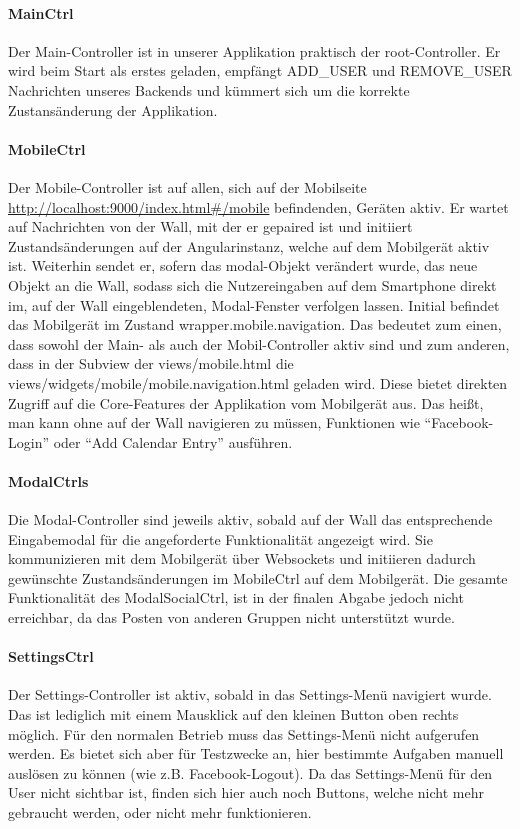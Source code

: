 \documentclass[10pt,a4paper]{report}
\newcommand{\code}[1]{{\fontfamily{cmvtt}\selectfont #1}}
\begin{document}
				\paragraph{MainCtrl}
					Der Main-Controller ist in unserer Applikation praktisch der root-Controller. Er wird beim Start als erstes geladen, empfängt \code{ADD\_USER} und \code{REMOVE\_USER} Nachrichten unseres Backends und kümmert sich um die korrekte Zustansänderung der Applikation.
				\paragraph{MobileCtrl}
					Der Mobile-Controller ist auf allen, sich auf der Mobilseite \url{http://localhost:9000/index.html\#/mobile} befindenden, Geräten aktiv. Er wartet auf Nachrichten von der Wall, mit der er gepaired ist und initiiert Zustandsänderungen auf der Angularinstanz, welche auf dem Mobilgerät aktiv ist. Weiterhin sendet er, sofern das \code{modal}-Objekt verändert wurde, das neue Objekt an die Wall, sodass sich die Nutzereingaben auf dem Smartphone direkt im, auf der Wall eingeblendeten, Modal-Fenster verfolgen lassen. Initial befindet das Mobilgerät im Zustand \code{wrapper.mobile.navigation}. Das bedeutet zum einen, dass sowohl der Main- als auch der Mobil-Controller aktiv sind und zum anderen, dass in der Subview der \code{views/mobile.html} die \code{views/widgets/mobile/mobile.navigation.html} geladen wird. Diese bietet direkten Zugriff auf die Core-Features der Applikation vom Mobilgerät aus. Das heißt, man kann ohne auf der Wall navigieren zu müssen, Funktionen wie "`Facebook-Login"' oder "`Add Calendar Entry"' ausführen.
				\paragraph{ModalCtrls}
					Die Modal-Controller sind jeweils aktiv, sobald auf der Wall das entsprechende Eingabemodal für die angeforderte Funktionalität angezeigt wird. Sie kommunizieren mit dem Mobilgerät über Websockets und initiieren dadurch gewünschte Zustandsänderungen im MobileCtrl auf dem Mobilgerät. Die gesamte Funktionalität des ModalSocialCtrl, ist in der finalen Abgabe jedoch nicht erreichbar, da das Posten von anderen Gruppen nicht unterstützt wurde.
				\paragraph{SettingsCtrl}
					Der Settings-Controller ist aktiv, sobald in das Settings-Menü navigiert wurde. Das ist lediglich mit einem Mausklick auf den kleinen Button oben rechts möglich. Für den normalen Betrieb muss das Settings-Menü nicht aufgerufen werden. Es bietet sich aber für Testzwecke an, hier bestimmte Aufgaben manuell auslösen zu können (wie z.B. Facebook-Logout). Da das Settings-Menü für den User nicht sichtbar ist, finden sich hier auch noch Buttons, welche nicht mehr gebraucht werden, oder nicht mehr funktionieren.
\end{document}
